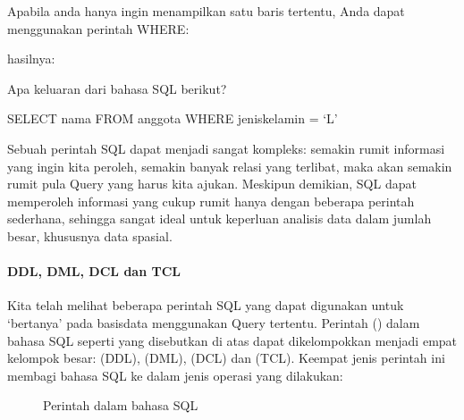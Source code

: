 \documentclass[letterpaper,10pt,english]{sphinxmanual}
\let\sphinxpxdimen\pdfpxdimen\else\newdimen\sphinxpxdimen
\begin{document}

Apabila anda hanya ingin menampilkan satu baris tertentu, Anda dapat menggunakan perintah WHERE:

\begin{sphinxVerbatim}[commandchars=\\\{\}]
       
\end{sphinxVerbatim}

hasilnya:


Apa keluaran dari bahasa SQL berikut?

\begin{sphinxVerbatim}[commandchars=\\\{\}]
SELECT nama FROM anggota WHERE jenis\PYGZus{}kelamin = ‘L’
\end{sphinxVerbatim}

Sebuah perintah SQL dapat menjadi sangat kompleks: semakin rumit informasi yang ingin kita peroleh, semakin banyak relasi yang terlibat, maka akan semakin rumit pula Query yang harus kita ajukan. Meskipun demikian, SQL dapat memperoleh informasi yang cukup rumit hanya dengan beberapa perintah sederhana, sehingga sangat ideal untuk keperluan analisis data dalam jumlah besar, khususnya data spasial.


\paragraph{DDL, DML, DCL dan TCL}
\label{\detokenize{sesi2/relationaldb:ddl-dml-dcl-dan-tcl}}
Kita telah melihat beberapa perintah SQL yang dapat digunakan untuk ‘bertanya’ pada basisdata menggunakan Query tertentu. Perintah () dalam bahasa SQL seperti yang disebutkan di atas dapat dikelompokkan menjadi empat kelompok besar:  (DDL),  (DML),  (DCL) dan  (TCL). Keempat jenis perintah ini membagi bahasa SQL ke dalam jenis operasi yang dilakukan:

\begin{figure}[htbp]
\centering
\capstart

\noindent\sphinxincludegraphics[height=300\sphinxpxdimen]{{2020-12-08-00-54-04}.png}
\caption{Perintah dalam bahasa SQL}\label{\detokenize{sesi2/relationaldb:ddl}}\end{figure}
\end{document}
